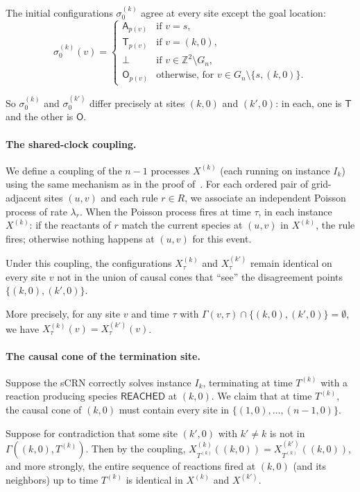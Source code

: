 \documentclass[11pt]{article}
\theoremstyle{plain}
\theoremstyle{definition}
\theoremstyle{remark}
\newcommand{\Z}{\mathbb{Z}}
\begin{document}
The initial configurations $\sigma_0^{(k)}$ agree at every site except the goal location:
\[
\sigma_0^{(k)}(v) = \begin{cases}
\mathsf{A}_{p(v)} & \text{if } v = s, \\
\mathsf{T}_{p(v)} & \text{if } v = (k, 0), \\
\bot & \text{if } v \in \Z^2 \setminus G_n, \\
\mathsf{O}_{p(v)} & \text{otherwise, for } v \in G_n \setminus \{s, (k,0)\}.
\end{cases}
\]

So $\sigma_0^{(k)}$ and $\sigma_0^{(k')}$ differ precisely at sites $(k, 0)$ and $(k', 0)$: in each, one is $\mathsf{T}$ and the other is $\mathsf{O}$.

\paragraph{The shared-clock coupling.}
We define a coupling of the $n-1$ processes $X^{(k)}$ (each running on instance $I_k$) using the same mechanism as in the proof of~. For each ordered pair of grid-adjacent sites $(u, v)$ and each rule $r \in R$, we associate an independent Poisson process of rate $\lambda_r$. When the Poisson process fires at time $\tau$, in each instance $X^{(k)}$: if the reactants of $r$ match the current species at $(u, v)$ in $X^{(k)}$, the rule fires; otherwise nothing happens at $(u, v)$ for this event.

Under this coupling, the configurations $X^{(k)}_\tau$ and $X^{(k')}_\tau$ remain identical on every site $v$ not in the union of causal cones that ``see'' the disagreement points $\{(k, 0), (k', 0)\}$.

More precisely, for any site $v$ and time $\tau$ with $\Gamma(v, \tau) \cap \{(k, 0), (k', 0)\} = \emptyset$, we have $X^{(k)}_\tau(v) = X^{(k')}_\tau(v)$.

\paragraph{The causal cone of the termination site.}
Suppose the sCRN correctly solves instance $I_k$, terminating at time $T^{(k)}$ with a reaction producing species $\mathsf{REACHED}$ at $(k, 0)$. We claim that at time $T^{(k)}$, the causal cone of $(k, 0)$ must contain every site in $\{(1, 0), \ldots, (n-1, 0)\}$.

Suppose for contradiction that some site $(k', 0)$ with $k' \neq k$ is not in $\Gamma((k, 0), T^{(k)})$. Then by the coupling, $X^{(k)}_{T^{(k)}}((k, 0)) = X^{(k')}_{T^{(k)}}((k, 0))$, and more strongly, the entire sequence of reactions fired at $(k, 0)$ (and its neighbors) up to time $T^{(k)}$ is identical in $X^{(k)}$ and $X^{(k')}$.
\end{document}
